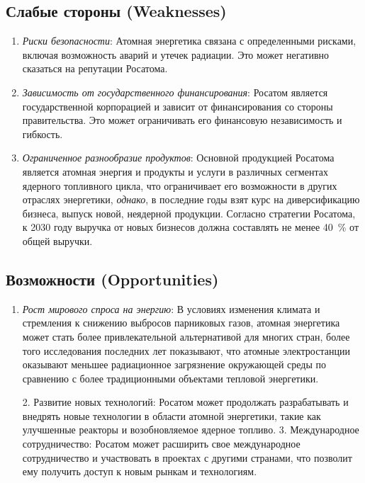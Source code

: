 \subsection{Слабые стороны (Weaknesses)}
\begin{enumerate}
\item \emph{Риски безопасности}: Атомная энергетика связана с определенными рисками, включая возможность аварий и утечек радиации. Это может негативно сказаться на репутации Росатома.

\item \emph{Зависимость от государственного финансирования}: Росатом является государственной корпорацией и зависит от финансирования со стороны правительства. Это может ограничивать его финансовую независимость и гибкость.

\item \emph{Ограниченное разнообразие продуктов}: Основной продукцией Росатома является атомная энергия и продукты и услуги в различных сегментах ядерного топливного цикла, что ограничивает его возможности в других отраслях энергетики, \emph{однако}, в последние годы взят курс на диверсификацию бизнеса, выпуск новой, неядерной продукции. Согласно стратегии Росатома, к 2030 году выручка от новых бизнесов должна составлять не менее 40~\% от общей выручки.
\end{enumerate}

\subsection{Возможности (Opportunities)}
\begin{enumerate}
\item \emph{Рост мирового спроса на энергию}: В условиях изменения климата и стремления к снижению выбросов парниковых газов, атомная энергетика может стать более привлекательной альтернативой для многих стран, более того исследования последних лет показывают, что атомные электростанции оказывают меньшее радиационное загрязнение окружающей среды по сравнению с более традиционными объектами тепловой энергетики.

2. Развитие новых технологий: Росатом может продолжать разрабатывать и внедрять новые технологии в области атомной энергетики, такие как улучшенные реакторы и возобновляемое ядерное топливо.
3. Международное сотрудничество: Росатом может расширить свое международное сотрудничество и участвовать в проектах с другими странами, что позволит ему получить доступ к новым рынкам и технологиям.
\end{enumerate}

